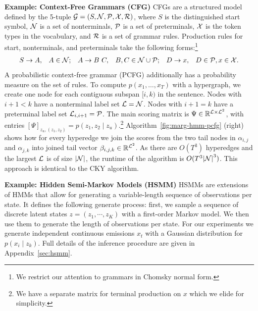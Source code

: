 \documentclass{article}
\begin{document}
\textbf{Example: Context-Free Grammars (CFG)}
CFGs are a structured model defined by the 5-tuple 
$\mathcal{G} = (S,\mathcal{N},\mathcal{P},\mathcal{X},\mathcal{R})$, where $S$ is the distinguished start symbol, $\mathcal{N}$ is a set of nonterminals, $\mathcal{P}$ is a set of preterminals, $\mathcal{X}$ is the token types in the vocabulary, and $\mathcal{R}$ is a set of grammar rules.
Production rules for start, nonterminals, and preterminals take the following forms:\footnote{
We restrict our attention to grammars in Chomsky normal form.}
\begin{equation}
\label{eqn:pcfg-rules}
\begin{aligned}
S&\to A, & A\in\mathcal{N}; &&
A&\to B\ C, & B,C\in\mathcal{N}\cup\mathcal{P}; &&
D&\to x, & D \in\mathcal{P},x\in\mathcal{X}.
\end{aligned}
\end{equation}
A probabilistic context-free grammar (PCFG) additionally has a probability measure on the set of rules.
To compute $p(x_1, \ldots, x_T)$ with a hypergraph, we create one node for each contiguous
 subspan $[i, k)$ in the sentence. Nodes with $i + 1 < k$ have a
nonterminal label set ${\cal L} = \mathcal{N}$. Nodes with $i + 1=k$ have a 
preterminal label set ${\cal L}_{i,i+1} = \mathcal{P}$.
The main scoring matrix is $\Psi\in\mathbb{R}^{\mathcal{L}\times \mathcal{L}^2}$, with entries $[\Psi]_{z_u,(z_1,z_2)} = p(z_1,z_2\mid z_u)$.\footnote{We have a separate matrix for terminal production on $x$ which we elide for 
simplicity.}
Algorithm~\ref{fig:marg-hmm-pcfg} (right) shows how for every hyperedge we join the scores from the two tail nodes in $\alpha_{i,j}$ and $\alpha_{j,k}$ into joined tail vector $\beta_{i,j,k}\in\mathbb{R}^{\mathcal{L}^2}$. %
As there are $O(T^3)$ hyperedges and the largest ${\cal L}$ is of size
$|\mathcal{N}|$, the runtime of the algorithm is $O(T^3 {|\mathcal{N}|}^3)$. This approach is identical to the CKY algorithm.

\textbf{Example: Hidden Semi-Markov Models (HSMM)}
HSMMs are extensions of HMMs that allow for generating a variable-length sequence of observations per state. 
It defines the following generate process: first, we sample a sequence of discrete latent states $z=(z_1, \cdots, z_K)$ with a first-order Markov model. We then use them to generate the length of observations per state. For our experiments we generate independent continuous emissions $x_t$ with a Gaussian distribution for $p(x_i\mid z_k)$. Full details of the inference procedure are given in Appendix~\ref{sec:hsmm}.
\end{document}
